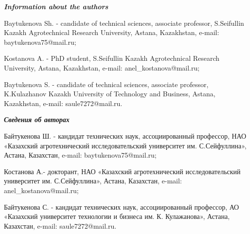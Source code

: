 \begin{info}
\hspace{1em}\emph{{\bfseries Information about the authors}}

Baytukenova Sh. - candidate of technical sciences, associate professor,
S.Seifullin Kazakh Agrotechnical Research University, Astana,
Kazakhstan, e-mail:
baytukenova75@mail.ru;

Kostanova A. - PhD student, S.Seifullin Kazakh Agrotechnical Research
University, Astana, Kazakhstan, e-mail: anel\_kostanova@mail.ru;

Baytukenova S. - candidate of technical sciences, associate professor,
K.Kulazhanov Kazakh University of Technology and Business, Astana,
Kazakhstan, e-mail:
saule7272@mail.ru.

\hspace{1em}\emph{{\bfseries Сведения об авторах}}

Байтукенова Ш. - кандидат технических наук, ассоциированный профессор,
НАО «Казахский агротехнический исследовательский университет им.
С.Сейфуллина», Астана, Казахстан, e-mail: baytukenova75@mail.ru;

Костанова А.- докторант, НАО «Казахский агротехнический
исследовательский университет им. С.Сейфуллина», Астана, Казахстан,
e-mail: anel\_kostanova@mail.ru;

Байтукенова С. - кандидат технических наук, ассоциированный профессор,
АО «Казахский университет технологии и бизнеса им. К. Кулажанова»,
Астана, Казахстан, e-mail: saule7272@mail.ru.
\end{info}
